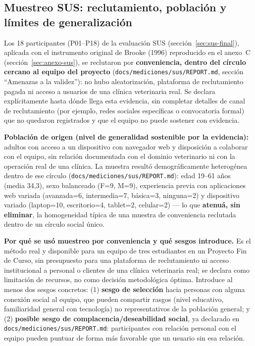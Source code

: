 \subsection{Muestreo SUS: reclutamiento, poblaci\'on y l\'imites de generalizaci\'on}
\label{sec:muestreo-sus-metodologia}

Los 18 participantes (P01--P18) de la evaluaci\'on SUS
(secci\'on~\ref{sec:sus-final}), aplicada con el instrumento original de
Brooke (1996) reproducido en el anexo~C
(secci\'on~\ref{sec:anexo-sus}), se reclutaron por \textbf{conveniencia,
dentro del c\'irculo cercano al equipo del proyecto}
(\texttt{docs/mediciones/sus/REPORT.md}, secci\'on ``Amenazas a la
validez''): no hubo aleatorizaci\'on, plataforma de reclutamiento pagada
ni acceso a usuarios de una cl\'inica veterinaria real. Se declara
expl\'icitamente hasta d\'onde llega esta evidencia, sin completar
detalles de canal de reclutamiento (por ejemplo, redes sociales
espec\'ificas o convocatoria formal) que no quedaron registrados y que el
equipo no puede sostener con evidencia.

\textbf{Poblaci\'on de origen (nivel de generalidad sostenible por la
evidencia):} adultos con acceso a un dispositivo con navegador web y
disposici\'on a colaborar con el equipo, sin relaci\'on documentada con
el dominio veterinario ni con la operaci\'on real de una cl\'inica. La
muestra result\'o demogr\'aficamente heterog\'enea dentro de ese c\'irculo
(\texttt{docs/mediciones/sus/REPORT.md}): edad 19--61 a\~nos (media
34{,}3), sexo balanceado (F=9, M=9), experiencia previa con aplicaciones
web variada (avanzada=6, intermedia=7, b\'asica=3, ninguna=2) y
dispositivo variado (laptop=10, escritorio=4, tablet=2, celular=2) --- lo
que \textbf{atenu\'a, sin eliminar}, la homogeneidad t\'ipica de una
muestra de conveniencia reclutada dentro de un c\'irculo social \'unico.

\textbf{Por qu\'e se us\'o muestreo por conveniencia y qu\'e sesgos
introduce.} Es el m\'etodo real y disponible para un equipo de tres
estudiantes en un Proyecto Fin de Curso, sin presupuesto para una
plataforma de reclutamiento ni acceso institucional a personal o
clientes de una cl\'inica veterinaria real; se declara como limitaci\'on
de recursos, no como decisi\'on metodol\'ogica \'optima. Introduce al
menos dos sesgos concretos: (1) \textbf{sesgo de selecci\'on} hacia
personas con alguna conexi\'on social al equipo, que pueden compartir
rasgos (nivel educativo, familiaridad general con tecnolog\'ia) no
representativos de la poblaci\'on general; y (2) \textbf{posible sesgo de
complacencia/deseabilidad social}, ya declarado en
\texttt{docs/mediciones/sus/REPORT.md}: participantes con relaci\'on
personal con el equipo pueden puntuar de forma m\'as favorable que un
usuario sin esa relaci\'on.

